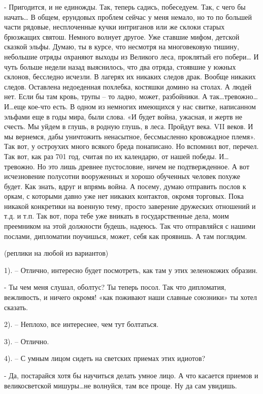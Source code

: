 \documentclass[12pt,a4paper]{book}
\begin{document}
- Пригодится, и не единожды. Так, теперь садись, побеседуем. Так, с чего бы начать… В общем, ерундовых проблем сейчас у меня немало, но то по большей части рядовые, несплоченные кучки интриганов или же склоки старых брюзжащих святош. Немного волнует другое. Уже ставшие мифом, детской сказкой эльфы. Думаю, ты в курсе, что несмотря на многовековую тишину, небольшие отряды охраняют выходы из Великого леса, проклятый его побери… И чуть больше недели назад выяснилось, что два отряда, стоявшие у южных склонов, бесследно исчезли. В лагерях их никаких следов драк. Вообще никаких следов. Оставлена недоеденная похлебка, костяшки домино на столах. А людей нет. Если бы там кровь, трупы – то ладно, может, разбойники. А так…тревожно… И…еще кое-что есть. В одном из немногих имеющихся у нас свитке, написанном эльфами еще в годы мира, были слова. «И будет война, ужасная, и жертв не счесть. Мы уйдем в глушь, в родную глушь, в леса. Пройдут века. VII веков. И мы вернемся, дабы уничтожить ненасытное, бессмысленно кровожадное племя». Так вот, у остроухих много всякого бреда понаписано. Но вспомнил вот, перечел. Так вот, как раз 701 год, считая по их календарю, от нашей победы. И… тревожно. Но это лишь древнее пустословие, ничем не подтвержденное. А вот исчезновение полусотни вооруженных и хорошо обученных человек похуже будет. Как знать, вдруг и впрямь война. А посему, думаю отправить послов к оркам, с которыми давно уже нет никаких контактов, окромя торговых. Пока никакой конкретики на военную тему, просто заверение дружеских отношений и т.д. и т.п. Так вот, пора тебе уже вникать в государственные дела, моим преемником на этой должности будешь, надеюсь. Так что отправляйся с нашими послами, дипломатии поучишься, может, себя как проявишь. А там поглядим.

(реплики на любой из вариантов)

1). – Отлично, интересно будет посмотреть, как там у этих зеленокожих образин.

- Ты чем меня слушал, оболтус? Ты теперь посол. Так что дипломатия, вежливость, и ничего окромя! «как поживают наши славные союзники» ты хотел сказать.

2). – Неплохо, все интереснее, чем тут болтаться.

3). – Отлично.

4). – С умным лицом сидеть на светских приемах этих идиотов?

- Да, постарайся хотя бы научиться делать умное лицо. А что касается приемов и великосветской мишуры…не волнуйся, там все проще. Ну да сам увидишь.
\end{document}
